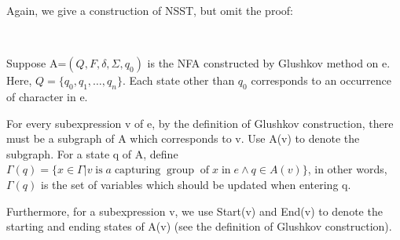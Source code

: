\documentclass{article}
\newcommand{\tmop}[1]{\ensuremath{\operatorname{#1}}}
\begin{document}
Again, we give a construction of NSST, but omit the proof:

\

Suppose A=$(Q, F, \delta, \Sigma, q_0)$ is the NFA constructed by Glushkov
method on e. Here, $Q = \{ q_0, q_1, \ldots, q_n \}$. Each state other than
$q_0$ corresponds to an occurrence of character in e.

For every subexpression v of e, by the definition of Glushkov construction,
there must be a subgraph of A which corresponds to v. Use A(v) to denote the
subgraph. For a state q of A, define $\Gamma (q) = \{ x \in \Gamma |v
\tmop{is} a \tmop{capturing} \tmop{group} \tmop{of} x \tmop{in} e \wedge q \in
A (v) \}$, in other words, $\Gamma (q)$ is the set of variables which should
be updated when entering q.

Furthermore, for a subexpression v, we use Start(v) and End(v) to denote the
starting and ending states of A(v) (see the definition of Glushkov
construction).

\
\end{document}
